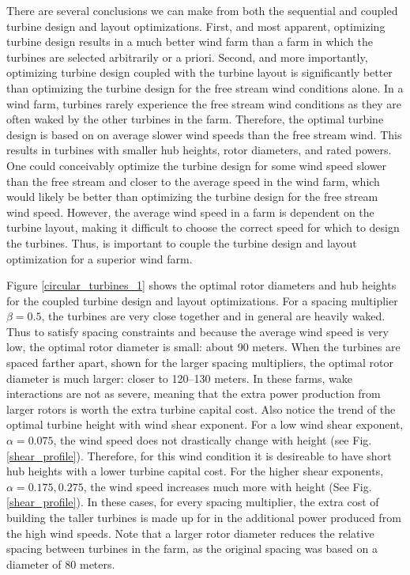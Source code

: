 \documentclass[wes, manuscript]{copernicus}
\begin{document}
There are several conclusions we can make from both the sequential and coupled turbine design and layout optimizations. First, and most apparent, optimizing turbine design results in a much better wind farm than a farm in which the turbines are selected arbitrarily or a priori. Second, and more importantly, optimizing turbine design coupled with the turbine layout is significantly better than optimizing the turbine design for the free stream wind conditions alone. In a wind farm, turbines rarely experience the free stream wind conditions as they are often waked by the other turbines in the farm. Therefore, the optimal turbine design is based on on average slower wind speeds than the free stream wind. This results in turbines with smaller hub heights, rotor diameters, and rated powers. 
%
One could conceivably optimize the turbine design for some wind speed slower than the free stream and closer to the average speed in the wind farm, which would likely be better than optimizing the turbine design for the free stream wind speed. However, the average wind speed in a farm is dependent on the turbine layout, making it difficult to choose the correct speed for which to design the turbines. Thus, is important to couple the turbine design and layout optimization for a superior wind farm. 

Figure \ref{circular_turbines_1} shows the optimal rotor diameters and hub heights for the coupled turbine design and layout optimizations. For a spacing multiplier $\beta=0.5$, the turbines are very close together and in general are heavily waked. Thus to satisfy spacing constraints and because the average wind speed is very low, the optimal rotor diameter is small: about 90 meters. When the turbines are spaced farther apart, shown for the larger spacing multipliers, the optimal rotor diameter is much larger: closer to 120--130 meters. In these farms, wake interactions are not as severe, meaning that the extra power production from larger rotors is worth the extra turbine capital cost. Also notice the trend of the optimal turbine height with wind shear exponent. For a low wind shear exponent, $\alpha=0.075$, the wind speed does not drastically change with height (see Fig. \ref{shear_profile}). Therefore, for this wind condition it is desireable to have short hub heights with a lower turbine capital cost. For the higher shear exponents, $\alpha=0.175,0.275$, the wind speed increases much more with height (See Fig. \ref{shear_profile}). In these cases, for every spacing multiplier, the extra cost of building the taller turbines is made up for in the additional power produced from the high wind speeds. Note that a larger rotor diameter reduces the relative spacing between turbines in the farm, as the original spacing was based on a diameter of 80 meters.
\end{document}
